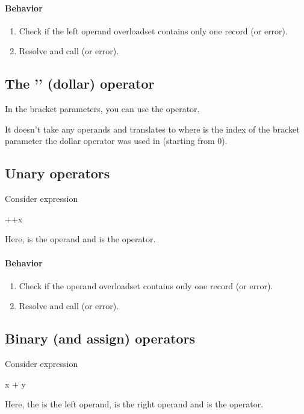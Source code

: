 \paragraph{Behavior}
\begin{enumerate}
	\item Check if the left operand overloadset contains only one record (or error).
	\item Resolve and call  (or error).
\end{enumerate}

\subsection{The '\inlineCode{\$}' (dollar) operator}
In the bracket parameters, you can use the \inlineCode{\$} operator.

It doesn't take any operands and translates to  where  is the index of the bracket parameter the dollar operator was used in (starting from 0).

\subsection{Unary operators}
Consider expression
\begin{code}
	++x
\end{code}

Here,  is the operand and \inlineCode{++} is the operator.

\paragraph{Behavior}
\begin{enumerate}
	\item Check if the operand overloadset contains only one record (or error).
	\item Resolve and call  (or error).
\end{enumerate}

\subsection{Binary (and assign) operators}
Consider expression
\begin{code}
	x + y
\end{code}

Here, the  is the left operand,  is the right operand and \inlineCode{+} is the operator.

